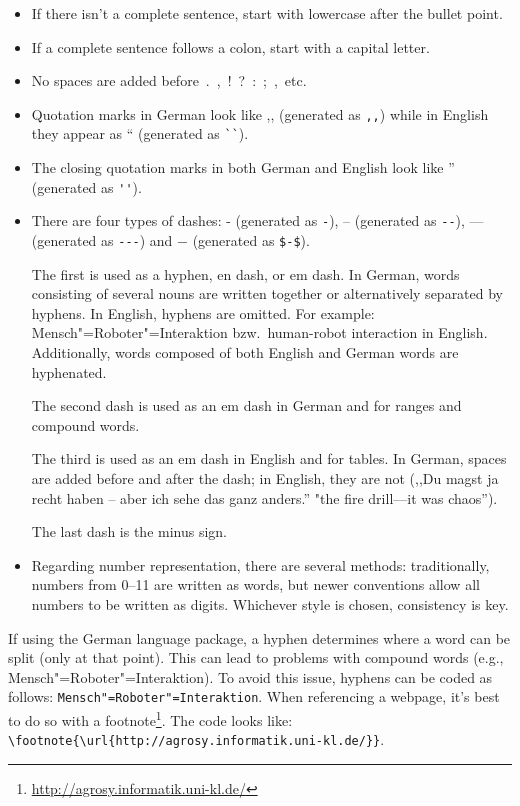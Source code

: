 \begin{itemize}
 \item If there isn't a complete sentence, start with lowercase after the bullet point.
 \item If a complete sentence follows a colon, start with a capital letter.
 \item No spaces are added before~.~,~!~?~:~;~,~etc.
 \item Quotation marks in German look like ,, (generated as \verb|,,|) while in English they appear  as `` (generated as \verb|``|).
 \item The closing quotation marks in both German and English look like '' (generated as \verb|''|).
 \item  There are four types of dashes: - (generated as \verb|-|), -- (generated as \verb|--|), --- (generated as \verb|---|) and $-$ (generated as \verb|$-$|). 

 The first is used as a hyphen, en dash, or em dash. In German, words consisting of several nouns are written together or alternatively separated by hyphens. In English, hyphens are omitted. For example:
 Mensch"=Roboter"=Interaktion bzw.\ human-robot interaction in English. Additionally, words composed of both English and German words are hyphenated. 

 The second dash is used as an em dash in German and for ranges and compound words.

 The third is used as an em dash in English and for tables. In German, spaces are added before and after the dash; in English, they are not (,,Du magst ja recht haben -- aber ich sehe das ganz anders.'' "the fire drill---it was chaos'').


 The last dash is the minus sign.
 
 \item Regarding number representation, there are several methods: traditionally, numbers from 0--11 are written as words, but newer conventions allow all numbers to be written as digits. Whichever style is chosen, consistency is key. 
\end{itemize}

If using the German language package, a hyphen determines where a word can be split (only at that point). This can lead to problems with compound words (e.g., Mensch"=Roboter"=Interaktion). To avoid this issue, hyphens can be coded as follows: \verb|Mensch"=Roboter"=Interaktion|. When referencing a webpage, it's best to do so with a footnote\footnote{\url{http://agrosy.informatik.uni-kl.de/}}. The code looks like: \verb|\footnote{\url{http://agrosy.informatik.uni-kl.de/}}|.


